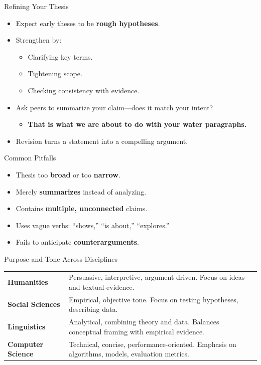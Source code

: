 \documentclass[aspectratio=169]{beamer}
\begin{document}
\begin{frame}{Refining Your Thesis}
\begin{itemize}
  \item Expect early theses to be \textbf{rough hypotheses}.
  \item Strengthen by:
    \begin{itemize}
      \item Clarifying key terms.
      \item Tightening scope.
      \item Checking consistency with evidence.
    \end{itemize}
  \item Ask peers to summarize your claim—does it match your intent?
    \begin{itemize}
    \item \textbf{That is what we are about to do with your water paragraphs.}
    \end{itemize}
  \item Revision turns a statement into a compelling argument.
\end{itemize}
\end{frame}


\begin{frame}{Common Pitfalls}
\begin{itemize}
  \item Thesis too \textbf{broad} or too \textbf{narrow}.
  \item Merely \textbf{summarizes} instead of analyzing.
  \item Contains \textbf{multiple, unconnected} claims.
  \item Uses vague verbs: “shows,” “is about,” “explores.”
  \item Fails to anticipate \textbf{counterarguments}.
\end{itemize}
\end{frame}



\begin{frame}{Purpose and Tone Across Disciplines}
\begin{tabular}{p{3cm}p{7cm}}
\textbf{Humanities} & Persuasive, interpretive, argument-driven.  
Focus on ideas and textual evidence. \\[0.5em]
\textbf{Social Sciences} & Empirical, objective tone.  
Focus on testing hypotheses, describing data. \\[0.5em]
\textbf{Linguistics} & Analytical, combining theory and data.  
Balances conceptual framing with empirical evidence. \\[0.5em]
\textbf{Computer Science} & Technical, concise, performance-oriented.  
Emphasis on algorithms, models, evaluation metrics.
\end{tabular}
\end{frame}
\end{document}
